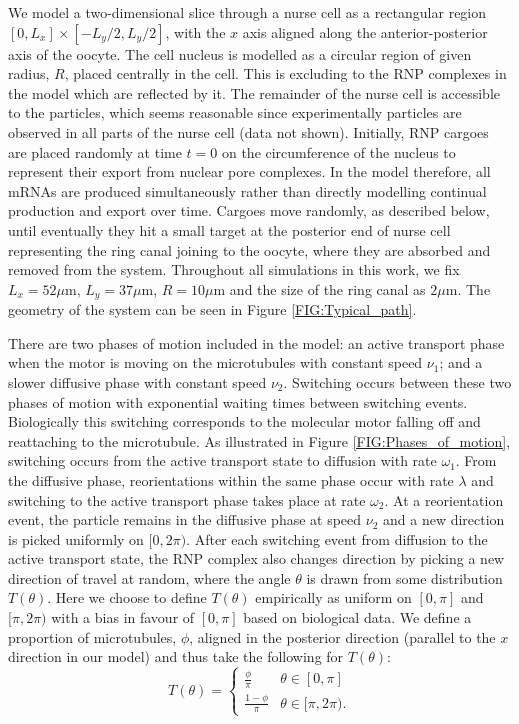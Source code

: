 \documentclass[twocolumn]{biophys}
\begin{document}
We model a two-dimensional slice through a nurse cell as a rectangular region $[0,L_x] \times [-L_y/2, L_y/2]$, with the $x$ axis aligned along the anterior-posterior axis of the oocyte.
The cell nucleus is modelled as a circular region of given radius, $R$, placed centrally in the cell. 
This is excluding to the RNP complexes in the model which are reflected by it.
The remainder of the nurse cell is accessible to the particles, which seems reasonable since experimentally particles are observed in all parts of the nurse cell (data not shown).
Initially, RNP cargoes are placed randomly at time $t=0$ on the circumference of the nucleus to represent their export from nuclear pore complexes.
In the model therefore, all mRNAs are produced simultaneously rather than directly modelling continual production and export over time.
Cargoes move randomly, as described below, until eventually they hit a small target at the posterior end of nurse cell representing the ring canal joining to the oocyte, where they are absorbed and removed from the system.
Throughout all simulations in this work, we fix $L_x=52 \mu \text{m}$, $L_y=37 \mu \text{m}$, $R=10 \mu \text{m}$ and the size of the ring canal as $2\mu \text{m}$.
The geometry of the system can be seen in Figure \ref{FIG:Typical_path}.

There are two phases of motion included in the model: an active transport phase when the motor is moving on the microtubules with constant speed $\nu_1$; and a slower diffusive phase with constant speed $\nu_2$.
Switching occurs between these two phases of motion with exponential waiting times between switching events.
Biologically this switching corresponds to the molecular motor falling off and reattaching to the microtubule.
As illustrated in Figure \ref{FIG:Phases_of_motion}, switching occurs from the active transport state to diffusion with rate $\omega_1$. 
From the diffusive phase, reorientations within the same phase occur with rate $\lambda$ and switching to the active transport phase takes place at rate $\omega_2$. 
At a reorientation event, the particle remains in the diffusive phase at speed $\nu_2$ and a new direction is picked uniformly on $[0,2\pi)$.
After each switching event from diffusion to the active transport state, the RNP complex also changes direction by picking a new direction of travel at random, where the angle $\theta $ is drawn from some distribution $T(\theta)$. 
Here we choose to define $T(\theta)$ empirically as uniform on $[0,\pi ]$ and $[\pi, 2\pi )$ with a bias in favour of $[0,\pi ]$ based on biological data.
We define a proportion of microtubules, $\phi$, aligned in the posterior direction (parallel to the $x$ direction in our model) and thus take the following for $T(\theta)$:
\begin{equation*}         
T(\theta) = \begin{cases} \frac{\phi}{\pi} &  \theta \in [0,\pi] \\ \frac{1-\phi}{\pi} &  \theta \in [\pi,2\pi).                       
\end{cases}
\end{equation*}
\end{document}

